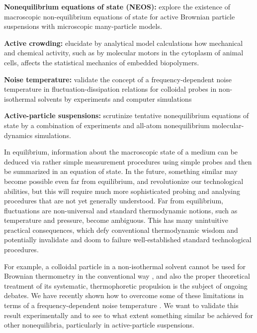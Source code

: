 \begin{workpackage}[id=WPactive,wphases=0-48,
  short=Active Particle Suspensions,%
  title=Probing active particle suspensions with colloids and polymers,
  lead=ULEI,
  ULEIRM=96,UNIPDRM=6,USTUTTRM=2]

\newrefsection

\begin{wpobjectives}
  \begin{compactitem}
  \item \textbf{Nonequilibrium equations of state (NEOS):} explore the existence of
  macroscopic non-equilibrium equations of state for active Brownian particle suspensions
  with microscopic many-particle models.
  \item \textbf{Active crowding:} elucidate by analytical model calculations how mechanical
  and chemical activity, such as by molecular motors in the cytoplasm of animal cells,
  affects the statistical mechanics of embedded biopolymers.
  \item \textbf{Noise temperature:} validate the concept of a frequency-dependent noise
  temperature in fluctuation-dissipation relations for colloidal probes 
  in non-isothermal solvents by experiments and computer simulations
  \item \textbf{Active-particle suspensions:} scrutinize tentative nonequilibrium equations
  of state by a combination of experiments and all-atom nonequilibrium molecular-dynamics
  simulations.
  \end{compactitem}
\end{wpobjectives}

\begin{wpdescription}
In equilibrium, information about the macroscopic state of a medium can be deduced via
rather simple measurement procedures using simple probes and then be summarized in an
equation of state.
%
In the future, something similar may become possible even far from equilibrium, and
revolutionize our technological abilities, but this will require much more sophisticated
probing and analysing procedures that are not yet generally understood.
%
Far from equilibrium, fluctuations are non-universal and standard thermodynamic notions,
such as temperature and pressure, become ambiguous.
%
This has many unintuitive practical consequences, which defy conventional thermodynamic
wisdom and potentially invalidate and doom to failure well-established standard
technological procedures.

For example, a colloidal particle in a non-isothermal solvent cannot be used for Brownian thermometry 
in the conventional way \cite{rings-etal:2010,kroy:2014}, and also the proper theoretical 
treatment of its systematic, thermophoretic propulsion is the subject of ongoing debates.
%
We have recently shown how to overcome some of these limitations in terms of a frequency-dependent noise 
temperature \cite{falasco-etal:2014}.
%
We want to validate this result experimentally and to see to what extent something similar be achieved for other 
nonequilibria, particularly in active-particle suspensions.


\end{wpdescription}
\end{workpackage}
